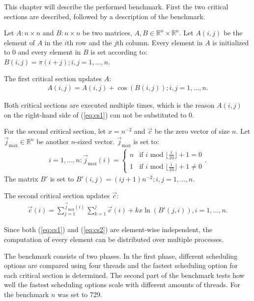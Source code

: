 \documentclass[twoside,11pt]{article}
\begin{document}
This chapter will describe the performed benchmark.
First the two critical sections are described, followed by
a description of the benchmark.

Let $A: n \times n$ and $B: n \times n$ be two matrices,
$A, B \in \mathbb{R}^n \times \mathbb{R}^n$.
Let $A(i, j)$ be the element of $A$ in the $i$th row and
the $j$th column.
Every element in $A$ is initialized to 0 and every element
in $B$ is set according to:
$B(i, j) = \pi(i+j); i,j=1,\dots,n$.

The first critical section updates $A$:
\begin{align}
  \label{eq:cs1}
  A(i, j) = A(i, j) + \cos(B(i, j)); i,j=1,\dots,n.
\end{align}

Both critical sections are executed multiple times, which
is the reason $A(i, j)$ on the right-hand side of
(\ref{eq:cs1}) can not be substituted to 0.

\def\jmax{\vec{j}_{\text{max} }}

For the second critical section,
let $x = n^{-2}$ and $\vec{c}$ be the zero vector of size
$n$.
Let $\jmax \in \mathbb{R}^n$ be another $n$-sized vector.
$\jmax$ is set to:
\begin{align*}
  i=1,\dots,n: \jmax(i) =
  \begin{cases}
    n &\text{if } i \text{ mod }
       \lfloor \frac{i}{10} \rfloor + 1 = 0 \\
    1 &\text{if } i \text{ mod }
       \lfloor \frac{i}{10} \rfloor + 1 \neq 0
  \end{cases}.
\end{align*}
The matrix $B'$ is set to $B'(i, j) = (ij + 1)n^{-2};
i,j = 1,\dots,n$.

The second critical section updates $\vec{c}$:
\begin{align}
  \label{eq:cs2}
  \vec{c}(i) = \sum_{j=1}^{\jmax(i)}\sum_{k=1}^{j}
    \vec{c}(i) + kx\ln(B'(j, i)), i=1,\dots,n.
\end{align}

Since both (\ref{eq:cs1}) and (\ref{eq:cs2}) are
element-wise independent, the computation of every element
can be distributed over multiple processes.

The benchmark consists of two phases.
In the first phase, different scheduling options are
compared using four threads and the fastest scheduling
option for each critical section is determined.
The second part of the benchmark tests how well the
fastest scheduling options scale with different amounts of
threads.
For the benchmark $n$ was set to 729.
\end{document}
